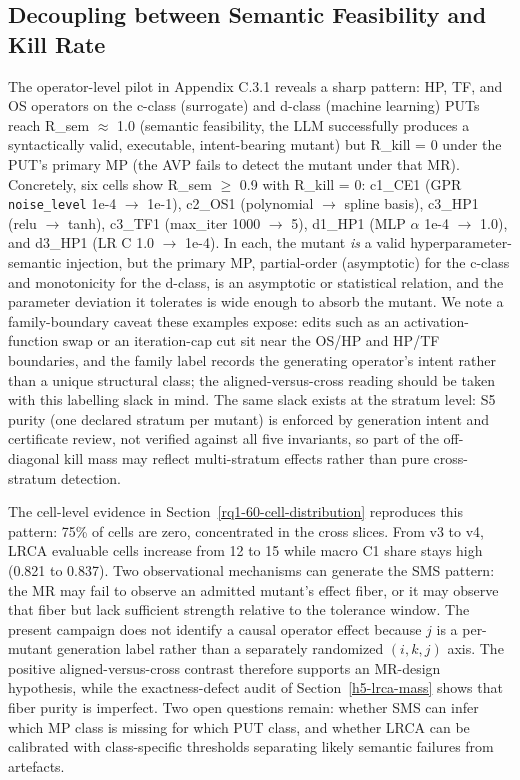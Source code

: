 \documentclass[review,12pt,authoryear]{elsarticle}
\begin{document}
\subsection{Decoupling between Semantic Feasibility and Kill Rate}\label{decoupling-between-r_sem-and-r_kill}

The operator-level pilot in Appendix C.3.1 reveals a sharp pattern: HP,
TF, and OS operators on the c-class (surrogate) and d-class (machine
learning) PUTs reach R\_sem $\approx$ 1.0 (semantic feasibility, the LLM
successfully produces a syntactically valid, executable, intent-bearing
mutant) but R\_kill = 0 under the PUT's primary MP (the AVP fails to
detect the mutant under that MR). Concretely, six cells show R\_sem $\geq$
0.9 with R\_kill = 0: c1\_CE1 (GPR \texttt{noise\_level} 1e-4 $\to$ 1e-1),
c2\_OS1 (polynomial $\to$ spline basis), c3\_HP1 (relu $\to$ tanh), c3\_TF1
(max\_iter 1000 $\to$ 5), d1\_HP1 (MLP $\alpha$ 1e-4 $\to$ 1.0), and d3\_HP1 (LR C 1.0
$\to$ 1e-4). In each, the mutant \emph{is} a valid hyperparameter-semantic
injection, but the primary MP, partial-order (asymptotic) for the
c-class and
monotonicity for the d-class, is an asymptotic or statistical relation,
and the parameter deviation it tolerates is wide enough to absorb the
mutant. We note a family-boundary caveat these examples expose: edits
such as an activation-function swap or an iteration-cap cut sit near
the OS/HP and HP/TF boundaries, and the family label records the
generating operator's intent rather than a unique structural class;
the aligned-versus-cross reading should be taken with this labelling
slack in mind. The same slack exists at the stratum level: S5 purity
(one declared stratum per mutant) is enforced by generation intent and
certificate review, not verified against all five invariants, so part
of the off-diagonal kill mass may reflect multi-stratum effects rather
than pure cross-stratum detection.

The cell-level evidence in Section~\ref{rq1-60-cell-distribution} reproduces this pattern: 75\% of cells
are zero, concentrated in the cross slices. From v3 to v4, LRCA
evaluable cells increase from 12 to 15 while macro C1 share stays high
(0.821 to 0.837). Two observational mechanisms can generate the SMS
pattern: the MR may fail to observe an admitted mutant's effect fiber,
or it may observe that fiber but lack sufficient strength relative to
the tolerance window. The present campaign does not identify a causal
operator effect because \(j\) is a per-mutant generation label rather
than a separately randomized \((i,k,j)\) axis. The positive
aligned-versus-cross contrast therefore supports an MR-design
hypothesis, while the exactness-defect audit of
Section~\ref{h5-lrca-mass} shows that fiber purity is imperfect. Two open questions remain:
whether SMS can infer which MP class is missing for which PUT class, and
whether LRCA can be calibrated with class-specific thresholds separating
likely semantic failures from artefacts.
\end{document}
